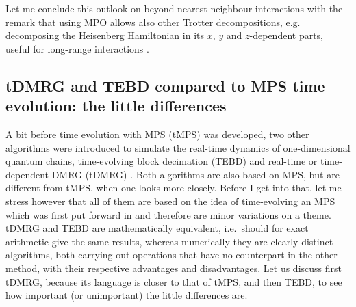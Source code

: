 \documentclass[a4paper,10pt,oneside,onecolumn,1p,times]{elsarticle}
\begin{document}
Let me conclude this outlook on beyond-nearest-neighbour interactions with the remark that using MPO allows also other Trotter decompositions, e.g. decomposing the Heisenberg Hamiltonian in its $x$, $y$ and $z$-dependent parts, useful for long-range interactions \cite{VerstraetePirvu08}. 
 

\subsection{tDMRG and TEBD compared to MPS time evolution: the little differences}
A bit before time evolution with MPS (tMPS) was developed, two other algorithms were introduced to simulate the real-time dynamics of one-dimensional quantum chains, time-evolving block decimation (TEBD)\cite{Vidal03a,Vidal04b} and real-time or time-dependent DMRG (tDMRG) \cite{Daley04,WhiteFeiguin04}. Both algorithms are also based on MPS, but are different from tMPS, when one looks more closely. Before I get into that, let me stress however that all of them are based on the idea of time-evolving an MPS which was first put forward in \cite{Vidal03a,Vidal04b} and therefore are minor variations on a theme. tDMRG and TEBD are mathematically equivalent, i.e.\ should for exact arithmetic give the same results, whereas numerically they are clearly distinct algorithms, both carrying out operations that have no counterpart in the other method, with their respective advantages and disadvantages. Let us discuss first tDMRG, because its language is closer to that of tMPS, and then TEBD, to see how important (or unimportant) the little differences are.
\end{document}
